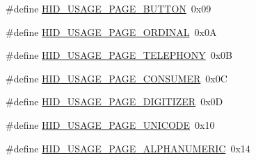 \begin{DoxyCompactItemize}
\#define \hyperlink{group___u_s_b_d___h_i_d_ga303a1c3920ca7b22c4d1af750897b808}{H\+I\+D\+\_\+\+U\+S\+A\+G\+E\+\_\+\+P\+A\+G\+E\+\_\+\+B\+U\+T\+T\+ON}~0x09
\item 
\#define \hyperlink{group___u_s_b_d___h_i_d_ga3a95742428e1df3ffb0e6ce94d4b5f70}{H\+I\+D\+\_\+\+U\+S\+A\+G\+E\+\_\+\+P\+A\+G\+E\+\_\+\+O\+R\+D\+I\+N\+AL}~0x0A
\item 
\#define \hyperlink{group___u_s_b_d___h_i_d_ga1e9dbe0dd0699f313276f9f0d6a82bbb}{H\+I\+D\+\_\+\+U\+S\+A\+G\+E\+\_\+\+P\+A\+G\+E\+\_\+\+T\+E\+L\+E\+P\+H\+O\+NY}~0x0B
\item 
\#define \hyperlink{group___u_s_b_d___h_i_d_gab0073496a706dcf681841328f14e53c3}{H\+I\+D\+\_\+\+U\+S\+A\+G\+E\+\_\+\+P\+A\+G\+E\+\_\+\+C\+O\+N\+S\+U\+M\+ER}~0x0C
\item 
\#define \hyperlink{group___u_s_b_d___h_i_d_gaf5dd509fe6bf4e8f400720e46cc93639}{H\+I\+D\+\_\+\+U\+S\+A\+G\+E\+\_\+\+P\+A\+G\+E\+\_\+\+D\+I\+G\+I\+T\+I\+Z\+ER}~0x0D
\item 
\#define \hyperlink{group___u_s_b_d___h_i_d_gac7b3e712eaff97931f7d5fc36468ec0d}{H\+I\+D\+\_\+\+U\+S\+A\+G\+E\+\_\+\+P\+A\+G\+E\+\_\+\+U\+N\+I\+C\+O\+DE}~0x10
\item 
\#define \hyperlink{group___u_s_b_d___h_i_d_gabbec7fd25201bab7caa5abaed67f9152}{H\+I\+D\+\_\+\+U\+S\+A\+G\+E\+\_\+\+P\+A\+G\+E\+\_\+\+A\+L\+P\+H\+A\+N\+U\+M\+E\+R\+IC}~0x14
\end{DoxyCompactItemize}
